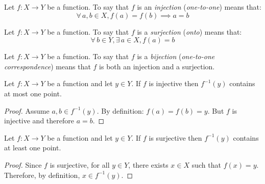 \documentclass[letterpaper,12pt,fleqn]{article}
\begin{document}
\begin{definition}[Injection]
  Let \(f:X\to Y\) be a function.  To say that \(f\) is an \emph{injection} (\emph{one-to-one}) means that:
  \[\forall\,a,b\in X,f(a)=f(b)\implies a=b\]
\end{definition}

\begin{definition}[Surjection]
  Let \(f:X\to Y\) be a function.  To say that \(f\) is a \emph{surjection} (\emph{onto}) means that:
  \[\forall\,b\in Y,\exists\,a\in X,f(a)=b\]
\end{definition}

\begin{definition}[Bijection]
  Let \(f:X\to Y\) be a function.  To say that \(f\) is a \emph{bijection} (\emph{one-to-one correspondence}) means
  that \(f\) is both an injection and a surjection.
\end{definition}

\begin{theorem}
  Let \(f:X\to Y\) be a function and let \(y\in Y\).  If \(f\) is injective then \(f^{-1}(y)\) contains at most
  one point.
\end{theorem}

\begin{proof}
  Assume \(a,b\in f^{-1}(y)\).  By definition: \(f(a)=f(b)=y\).  But \(f\) is injective and therefore \(a=b\).
\end{proof}

\begin{theorem}
  Let \(f:X\to Y\) be a function and let \(y\in Y\).  If \(f\) is surjective then \(f^{-1}(y)\) contains at least
  one point.
\end{theorem}

\begin{proof}
  Since \(f\) is surjective, for all \(y\in Y\), there exists \(x\in X\) such that \(f(x)=y\).  Therefore, by
  definition, \(x\in f^{-1}(y)\).
\end{proof}
\end{document}
